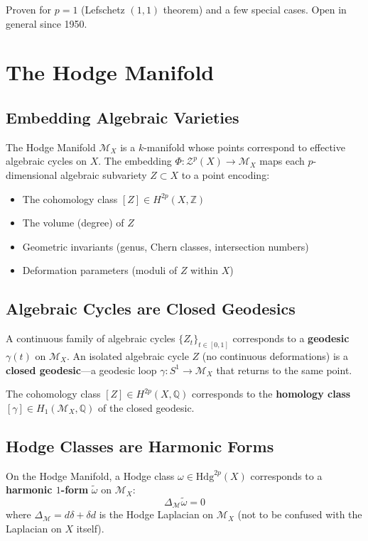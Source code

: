 \documentclass{article}
\begin{document}
Proven for $p=1$ (Lefschetz $(1,1)$ theorem) and a few special cases.
Open in general since 1950.

\section{The Hodge Manifold}
\label{sec:hodge-manifold}

\subsection{Embedding Algebraic Varieties}

The Hodge Manifold $\mathcal{M}_X$ is a $k$-manifold whose points correspond
to effective algebraic cycles on $X$.  The embedding $\Phi: \mathcal{Z}^p(X)
\to \mathcal{M}_X$ maps each $p$-dimensional algebraic subvariety $Z \subset
X$ to a point encoding:

\begin{itemize}
  \item The cohomology class $[Z] \in H^{2p}(X, \mathbb{Z})$
  \item The volume (degree) of $Z$
  \item Geometric invariants (genus, Chern classes, intersection numbers)
  \item Deformation parameters (moduli of $Z$ within $X$)
\end{itemize}

\subsection{Algebraic Cycles are Closed Geodesics}

A continuous family of algebraic cycles $\{Z_t\}_{t \in [0,1]}$ corresponds
to a \textbf{geodesic} $\gamma(t)$ on $\mathcal{M}_X$.  An isolated algebraic
cycle $Z$ (no continuous deformations) is a \textbf{closed geodesic}---a
geodesic loop $\gamma: S^1 \to \mathcal{M}_X$ that returns to the same point.

The cohomology class $[Z] \in H^{2p}(X, \mathbb{Q})$ corresponds to the
\textbf{homology class} $[\gamma] \in H_1(\mathcal{M}_X, \mathbb{Q})$ of
the closed geodesic.

\subsection{Hodge Classes are Harmonic Forms}

On the Hodge Manifold, a Hodge class $\omega \in \mathrm{Hdg}^{2p}(X)$
corresponds to a \textbf{harmonic $1$-form} $\tilde{\omega}$ on
$\mathcal{M}_X$:
\begin{equation}
\Delta_{\mathcal{M}} \tilde{\omega} = 0
\end{equation}
where $\Delta_{\mathcal{M}} = d\delta + \delta d$ is the Hodge Laplacian on
$\mathcal{M}_X$ (not to be confused with the Laplacian on $X$ itself).
\end{document}
